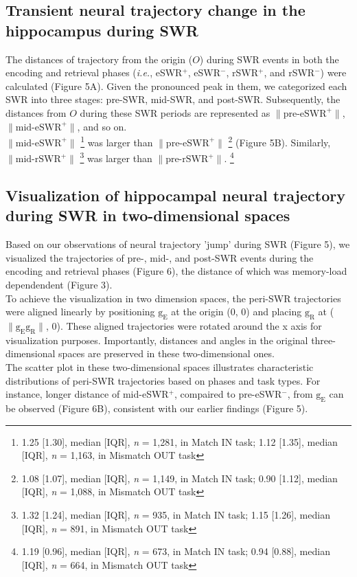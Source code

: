 \subsection{Transient neural trajectory change in the hippocampus during SWR}
The distances of trajectory from the origin ($O$) during SWR events in both the encoding and retrieval phases (\textit{\textit{i.e.}}, eSWR$^+$, eSWR$^-$, rSWR$^+$, and rSWR$^-$) were calculated (Figure 5A). Given the pronounced peak in them, we categorized each SWR into three stages: pre-SWR, mid-SWR, and post-SWR. Subsequently, the distances from $O$ during these SWR periods are represented as $\mathrm{\lVert \text{pre-eSWR}^+ \rVert}$, $\mathrm{\lVert \text{mid-eSWR}^+ \rVert}$, and so on.
\\
\indent
$\mathrm{\lVert \text{mid-eSWR}^+ \rVert}$
\footnote{1.25 [1.30], median [IQR], \textit{n} = 1,281, in Match IN task; 1.12 [1.35], median [IQR], \textit{n} = 1,163, in Mismatch OUT task}
was larger than $\mathrm{\lVert \text{pre-eSWR}^+ \rVert}$
\footnote{1.08 [1.07], median [IQR], \textit{n} = 1,149, in Match IN task; 0.90 [1.12], median [IQR], \textit{n} = 1,088, in Mismatch OUT task}
(Figure 5B). Similarly, $\mathrm{\lVert \text{mid-rSWR}^+ \rVert}$
\footnote{1.32 [1.24], median [IQR], \textit{n} = 935, in Match IN task; 1.15 [1.26], median [IQR], \textit{n} = 891, in Mismatch OUT task}
was larger than $\mathrm{\lVert \text{pre-rSWR}^+ \rVert}$.
\footnote{1.19 [0.96], median [IQR], \textit{n} = 673, in Match IN task; 0.94 [0.88], median [IQR], \textit{n} = 664, in Mismatch OUT task}

\subsection{Visualization of hippocampal neural trajectory during SWR in two-dimensional spaces}
Based on our observations of neural trajectory 'jump' during SWR (Figure 5), we visualized the trajectories of pre-, mid-, and post-SWR events during the encoding and retrieval phases (Figure 6), the distance of which was memory-load dependendent (Figure 3).
\\
\indent
To achieve the visualization in two dimension spaces, the peri-SWR trajectories were aligned linearly by positioning $\mathrm{g_{E}}$ at the origin (0, 0) and placing $\mathrm{g_{R}}$ at ($\mathrm{\lVert g_{E}g_{R} \rVert}$, 0). These aligned trajectories were rotated around the x axis for visualization purposes. Importantly, distances and angles in the original three-dimensional spaces are preserved in these two-dimensional ones.
\\
\indent
The scatter plot in these two-dimensional spaces illustrates characteristic distributions of peri-SWR trajectories based on phases and task types. For instance, longer distance of mid-eSWR$^+$, compaired to pre-eSWR$^-$, from $\mathrm{g_{E}}$ can be observed (Figure 6B), consistent with our earlier findings (Figure 5).

